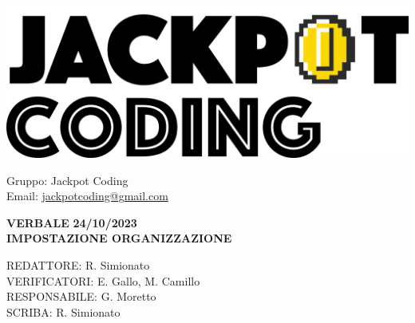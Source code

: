 \documentclass[5pt]{article}
\begin{document}
\begin{minipage}[t]{0.50\textwidth}
    \begin{flushleft}
        \hspace{10pt}
        \includegraphics[scale=0.65]{jackpot-logo.png} 
    \end{flushleft}
\end{minipage}
\hspace{-60pt} %
\begin{flushright}
    \begin{minipage}[t]{0.50\textwidth}
        \begin{flushright}
            Gruppo: {\Large Jackpot Coding}\\
            Email: \href{mailto:jackpotcoding@gmail.com}{jackpotcoding@gmail.com}
        \end{flushright}
    \end{minipage}
\end{flushright}

\vspace{24pt}

\begin{center}
    \textbf{\large VERBALE }
    \textbf{\large 24/10/2023} \\
    \textbf{\Large IMPOSTAZIONE ORGANIZZAZIONE}
\end{center}

\vspace{13pt}

\begin{flushleft}
    \begin{spacing}{1.5}
        REDATTORE: R. Simionato\\%
        VERIFICATORI: E. Gallo, M. Camillo \\
        RESPONSABILE: G. Moretto\\%
        \vspace{7pt}
        SCRIBA: R. Simionato\\%
    \end{spacing}
\end{flushleft}
\end{document}
